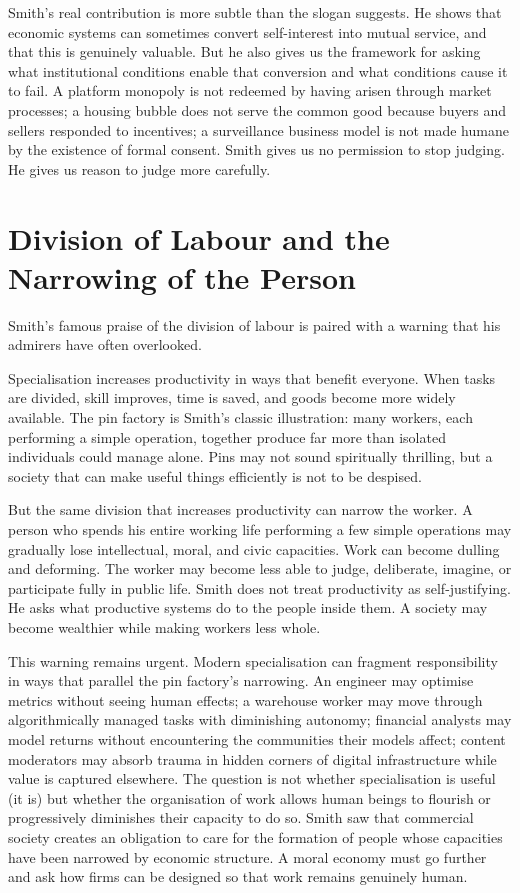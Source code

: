 \documentclass[11pt,a4paper,oneside]{book}
\begin{document}
Smith's real contribution is more subtle than the slogan suggests. He shows that economic systems can sometimes convert self-interest into mutual service, and that this is genuinely valuable. But he also gives us the framework for asking what institutional conditions enable that conversion and what conditions cause it to fail. A platform monopoly is not redeemed by having arisen through market processes; a housing bubble does not serve the common good because buyers and sellers responded to incentives; a surveillance business model is not made humane by the existence of formal consent. Smith gives us no permission to stop judging. He gives us reason to judge more carefully.

\section*{Division of Labour and the Narrowing of the Person}

Smith's famous praise of the division of labour is paired with a warning that his admirers have often overlooked.

Specialisation increases productivity in ways that benefit everyone. When tasks are divided, skill improves, time is saved, and goods become more widely available. The pin factory is Smith's classic illustration: many workers, each performing a simple operation, together produce far more than isolated individuals could manage alone. Pins may not sound spiritually thrilling, but a society that can make useful things efficiently is not to be despised.

But the same division that increases productivity can narrow the worker. A person who spends his entire working life performing a few simple operations may gradually lose intellectual, moral, and civic capacities. Work can become dulling and deforming. The worker may become less able to judge, deliberate, imagine, or participate fully in public life. Smith does not treat productivity as self-justifying. He asks what productive systems do to the people inside them. A society may become wealthier while making workers less whole.

This warning remains urgent. Modern specialisation can fragment responsibility in ways that parallel the pin factory's narrowing. An engineer may optimise metrics without seeing human effects; a warehouse worker may move through algorithmically managed tasks with diminishing autonomy; financial analysts may model returns without encountering the communities their models affect; content moderators may absorb trauma in hidden corners of digital infrastructure while value is captured elsewhere. The question is not whether specialisation is useful (it is) but whether the organisation of work allows human beings to flourish or progressively diminishes their capacity to do so. Smith saw that commercial society creates an obligation to care for the formation of people whose capacities have been narrowed by economic structure. A moral economy must go further and ask how firms can be designed so that work remains genuinely human.
\end{document}
